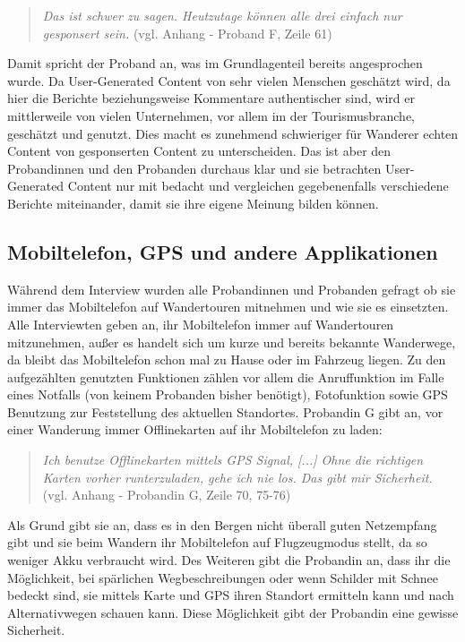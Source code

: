 \begin{quote}
	\textit{\glqq Das ist schwer zu sagen. Heutzutage können alle drei einfach nur gesponsert sein.\grqq} (vgl. Anhang - Proband F, Zeile 61)
\end{quote}

Damit spricht der Proband an, was im Grundlagenteil bereits angesprochen wurde. Da User-Generated Content von sehr vielen Menschen geschätzt wird, da hier die Berichte beziehungsweise Kommentare authentischer sind, wird er mittlerweile von vielen Unternehmen, vor allem im  der Tourismusbranche, geschätzt und genutzt. Dies macht es zunehmend schwieriger für Wanderer \glqq echten{\grqq} Content von gesponserten Content zu unterscheiden. Das ist aber den Probandinnen und den Probanden durchaus klar und sie betrachten User-Generated Content nur mit bedacht und vergleichen gegebenenfalls verschiedene Berichte miteinander, damit sie ihre eigene Meinung bilden können.

\subsection{Mobiltelefon, GPS und andere Applikationen}

Während dem Interview wurden alle Probandinnen und Probanden gefragt ob sie immer das Mobiltelefon auf Wandertouren mitnehmen und wie sie es einsetzten. Alle Interviewten geben an, ihr Mobiltelefon immer auf Wandertouren mitzunehmen, außer es handelt sich um kurze und bereits bekannte Wanderwege, da bleibt das Mobiltelefon schon mal zu Hause oder im Fahrzeug liegen. Zu den aufgezählten genutzten Funktionen zählen vor allem die Anruffunktion im Falle eines Notfalls (von keinem Probanden bisher benötigt), Fotofunktion sowie GPS Benutzung zur Feststellung des aktuellen Standortes. Probandin G gibt an, vor einer Wanderung immer Offlinekarten auf ihr Mobiltelefon zu laden:

\begin{quote}
	\textit{\glqq Ich benutze Offlinekarten mittels GPS Signal, [...] Ohne die richtigen Karten vorher runterzuladen, gehe ich nie los. Das gibt mir Sicherheit.\grqq} (vgl. Anhang - Probandin G, Zeile 70, 75-76)
\end{quote}

Als Grund gibt sie an, dass es in den Bergen nicht überall guten Netzempfang gibt und sie beim Wandern ihr Mobiltelefon auf Flugzeugmodus stellt, da so weniger Akku verbraucht wird. Des Weiteren gibt die Probandin an, dass ihr die Möglichkeit, bei spärlichen Wegbeschreibungen oder wenn Schilder mit Schnee bedeckt sind, sie mittels Karte und GPS ihren Standort ermitteln kann und nach Alternativwegen schauen kann. Diese Möglichkeit gibt der Probandin eine gewisse Sicherheit.

